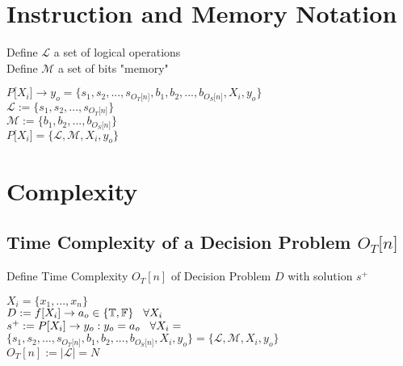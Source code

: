\documentclass[11pt]{article}
\begin{document}
\section{Instruction and Memory Notation}
Define $\mathcal{L}$ a set of logical operations\\
Define $\mathcal{M}$ a set of bits "memory"
\begin{center}
$
P \lbrack X_i \rbrack \rightarrow y_o = \{ s_1,s_2,...,s_{O_T \lbrack n \rbrack }, b_1, b_2,...,b_{O_S \lbrack n \rbrack},X_i,y_o \}
$
\\ \vspace{2mm}
$
\mathcal{L} := \{ s_1,s_2,...,s_{O_T \lbrack n \rbrack}\}
$
\\ \vspace{2mm}
$
\mathcal{M} := \{ b_1,b_2,...,b_{O_S \lbrack n \rbrack}\}
$
\\ \vspace{2mm}
$
P \lbrack X_i \rbrack = \{ \mathcal{L},\mathcal{M},X_i,y_o\}
$
\end{center}





















\section{Complexity}

\subsection{Time Complexity of a Decision Problem $O_T \lbrack n \rbrack$}
Define Time Complexity $O_T [n]$ of Decision Problem $D$ with solution $s^+$
\begin{center}
$
X_i = \{x_1,...,x_n\}
$
\\ \vspace{2mm}
$
D := f \lbrack X_i \rbrack \rightarrow a_{o} \in \{\mathbb{T}, \mathbb{F}\} \hspace{3mm} \forall X_i
$
\\ \vspace{2mm}
$
s^+ := P \lbrack X_i \rbrack \rightarrow y_{o} : y_o = a_{o} \hspace{3mm} \forall X_i = 
$
\\ \vspace{2mm}
$
\{ s_1,s_2,...,s_{O_T \lbrack n \rbrack }, b_1, b_2,...,b_{O_S \lbrack n \rbrack},X_i,y_o \} = \{ \mathcal{L},\mathcal{M},X_i,y_o\}
$
\\ \vspace{3mm}
$
O_T[n] := |\mathcal{L}| = N
$
\end{center}
\end{document}
